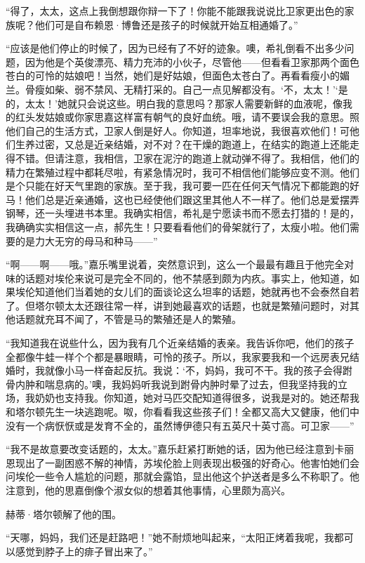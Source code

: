 \par “得了，太太，这点上我倒想跟你辩一下了！你能不能跟我说说比卫家更出色的家族呢？他们可是自布赖恩·博鲁还是孩子的时候就开始互相通婚了。”
\par “应该是他们停止的时候了，因为已经有了不好的迹象。噢，希礼倒看不出多少问题，因为他是个英俊漂亮、精力充沛的小伙子，尽管他——但看看卫家那两个面色苍白的可怜的姑娘吧！当然，她们是好姑娘，但面色太苍白了。再看看瘦小的媚兰。骨瘦如柴、弱不禁风、无精打采的。自己一点见解都没有。‘不，太太！'‘是的，太太！’她就只会说这些。明白我的意思吗？那家人需要新鲜的血液呢，像我的红头发姑娘或你家思嘉这样富有朝气的良好血统。哦，请不要误会我的意思。照他们自己的生活方式，卫家人倒是好人。你知道，坦率地说，我很喜欢他们！可他们生养过密，又总是近亲结婚，对不对？在干燥的跑道上，在结实的跑道上还能走得不错。但请注意，我相信，卫家在泥泞的跑道上就动弹不得了。我相信，他们的精力在繁殖过程中都耗尽啦，有紧急情况时，我可不相信他们能够应变不测。他们是个只能在好天气里跑的家族。至于我，我可要一匹在任何天气情况下都能跑的好马！他们总是近亲通婚，这也已经使他们跟这里其他人不一样了。他们总是爱摆弄钢琴，还一头埋进书本里。我确实相信，希礼是宁愿读书而不愿去打猎的！是的，我确确实实相信这一点，郝先生！只要看看他们的骨架就行了，太瘦小啦。他们需要的是力大无穷的母马和种马——”
\par “啊——啊——哦。”嘉乐嘴里说着，突然意识到，这么一个最最有趣且于他完全对味的话题对埃伦来说可是完全不同的，他不禁感到颇为内疚。事实上，他知道，如果埃伦知道他们当着她的女儿们的面谈论这么坦率的话题，她就再也不会泰然自若了。但塔尔顿太太还跟往常一样，讲到她最喜欢的话题，也就是繁殖问题时，对其他话题就充耳不闻了，不管是马的繁殖还是人的繁殖。
\par “我知道我在说些什么，因为我有几个近亲结婚的表亲。我告诉你吧，他们的孩子全都像牛蛙一样个个都是暴眼睛，可怜的孩子。所以，我家要我和一个远房表兄结婚时，我就像小马一样奋起反抗。我说：‘不，妈妈，我可不干。我的孩子会得跗骨内肿和喘息病的。’噢，我妈妈听我说到跗骨内肿时晕了过去，但我坚持我的立场，我奶奶也支持我。你知道，她对马匹交配知道得很多，说我是对的。她还帮我和塔尔顿先生一块逃跑呢。呶，你看看我这些孩子们！全都又高大又健康，他们中没有一个病恹恹或是发育不全的，虽然博伊德只有五英尺十英寸高。可卫家——”
\par “我不是故意要改变话题的，太太。”嘉乐赶紧打断她的话，因为他已经注意到卡丽恩现出了一副困惑不解的神情，苏埃伦脸上则表现出极强的好奇心。他害怕她们会问埃伦一些令人尴尬的问题，那就会露馅，显出他这个护送者是多么不称职了。他注意到，他的思嘉倒像个淑女似的想着其他事情，心里颇为高兴。
\par 赫蒂·塔尔顿解了他的围。
\par “天哪，妈妈，我们还是赶路吧！”她不耐烦地叫起来，“太阳正烤着我呢，我都可以感觉到脖子上的痱子冒出来了。”
